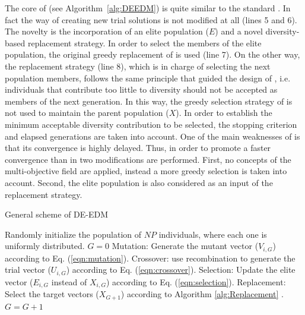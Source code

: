 The core of \DEEDM{} (see Algorithm~\ref{alg:DEEDM}) is quite similar to the standard \DE{}.
%
In fact the way of creating new trial solutions is not modified at all (lines 5 and 6).
%
The novelty is the incorporation of an elite population ($E$) and a novel diversity-based replacement strategy.
%
In order to select the members of the elite population, the original greedy replacement of \DE{} is used (line 7).
%
On the other way, the replacement strategy (line 8), which is in charge of selecting the next population members,
follows the same principle that guided the 
design of \RMDDC{}, i.e. individuals that contribute too little to diversity should not be accepted as members of the next generation.
%
In this way, the greedy selection strategy of \DE{} is not used to maintain the parent population ($X$).
%
In order to establish the minimum acceptable diversity contribution to be selected, the stopping criterion and elapsed
generations are taken into account.
%
One of the main weaknesses of \RMDDC{} is that its convergence is highly delayed.
%
Thus, in order to promote a faster convergence than in \RMDDC{} two modifications are performed.
%
First, no concepts of the multi-objective field are applied, instead a more greedy selection is taken into account.
%
Second, the elite population is also considered as an input of the replacement strategy.

\begin{algorithm}[t]
  \scriptsize
	\caption{General scheme of DE-EDM} 
	\begin{algorithmic}[1]
	\STATE Randomly initialize the population of $NP$ individuals, where each one is uniformly distributed.
	\STATE $G=0$
		\STATE Mutation: Generate the mutant vector ($V_{i,G}$) according to Eq. (\ref{eqn:mutation}).
		\STATE Crossover: use recombination to generate the trial vector ($U_{i,G}$) according to Eq. (\ref{eqn:crossover}).
		\STATE Selection: Update the elite vector ($E_{i,G}$ instead of $X_{i,G}$) according to Eq. (\ref{eqn:selection}).
	   \ENDFOR
		\STATE Replacement: Select the target vectors ($X_{G+1}$) according to Algorithm \ref{alg:Replacement} .
	   \STATE $G=G+1$
	\ENDWHILE
\end{algorithmic}
    \label{alg:DEEDM}
\end{algorithm}

%
%
%
%
%
%
%
%
%

